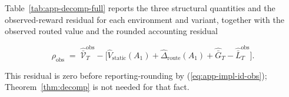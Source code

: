 \documentclass{article} %
\renewcommand{\eqref}[1]{\textup{(\ref{#1})}}
\begin{document}
\label{app:tab-decomp}

Table~\ref{tab:app-decomp-full} reports the three structural quantities and the
observed-reward residual for each environment and variant, together with the
observed routed value and the rounded accounting residual

\begin{equation}
\label{eq:app-tab-residual}
\rho_{\mathrm{obs}}
\;=\;
\widehat{\bar{\mathcal V}}_T^{\mathrm{obs}}
- \big[\widehat V_{\mathrm{static}}(A_1)
+ \widehat\Delta_{\mathrm{route}}(A_1)
+ \widehat{\bar G}_T
- \widehat{\bar L}_T^{\mathrm{obs}}\big].
\end{equation}

This residual is zero before reporting-rounding by
\eqref{eq:app-impl-id-obs}; Theorem~\ref{thm:decomp} is not needed for that
fact.
\end{document}
